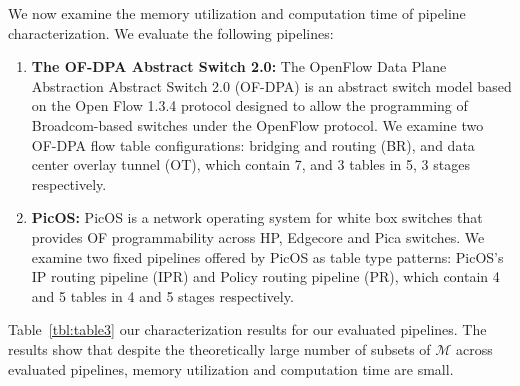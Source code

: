 We now examine the memory utilization and computation time of pipeline characterization. We evaluate the following pipelines:


\begin{enumerate}
  \item \textbf{The OF-DPA Abstract Switch 2.0:} The OpenFlow Data Plane Abstraction Abstract Switch 2.0 (OF-DPA) is an abstract switch model based on the Open Flow 1.3.4 protocol designed to allow the programming of Broadcom-based switches under the OpenFlow protocol. We examine two OF-DPA flow table configurations: bridging and routing (BR), and data center overlay tunnel (OT), which contain 7, and 3 tables in 5, 3 stages respectively.~\cite{OF-DPA}

  \item \textbf{PicOS:} PicOS is a network operating system for white box switches that provides OF programmability across HP, Edgecore and Pica switches. We examine two fixed pipelines offered by PicOS as table type patterns: PicOS's IP routing pipeline (IPR) and Policy routing pipeline (PR), which contain 4 and 5 tables in 4 and 5 stages respectively.~\cite{PicOS}
\end{enumerate}

 Table~\ref{tbl:table3} our characterization results for our evaluated pipelines. The results show that despite the theoretically large number of subsets of $\mathcal{M}$ across evaluated pipelines, memory utilization and computation time are small.



